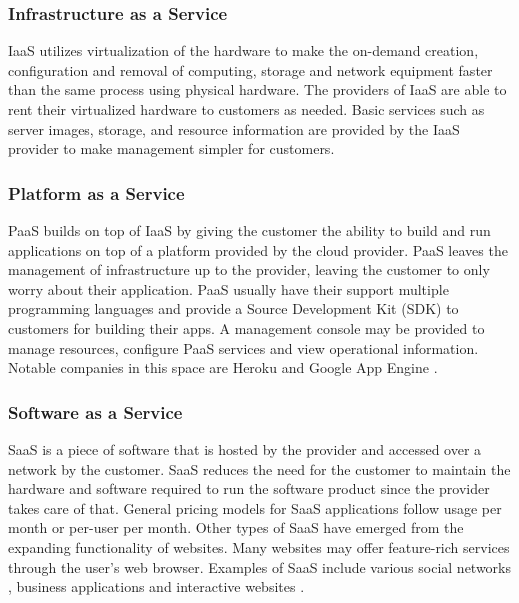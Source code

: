 \documentclass[12pt]{article}
\begin{document}
\subsubsection{Infrastructure as a Service} \label{ssub:iaas}

IaaS utilizes virtualization of the hardware to make the on-demand creation, configuration and removal of computing, storage and network equipment faster than the same process using physical hardware. The providers of IaaS are able to rent their virtualized hardware to customers as needed. Basic services such as server images, storage, and resource information are provided by the IaaS provider to make management simpler for customers.

\subsubsection{Platform as a Service} \label{ssub:paas}

PaaS builds on top of IaaS by giving the customer the ability to build and run applications on top of a platform provided by the cloud provider. PaaS leaves the management of infrastructure up to the provider, leaving the customer to only worry about their application. PaaS usually have their support multiple programming languages and provide a Source Development Kit (SDK) to customers for building their apps. A management console may be provided to manage resources, configure PaaS services and view operational information. Notable companies in this space are Heroku \cite{heroku} and Google App Engine \cite{googleappengine}.

\subsubsection{Software as a Service} \label{ssub:saas}

SaaS is a piece of software that is hosted by the provider and accessed over a network by the customer. SaaS reduces the need for the customer to maintain the hardware and software required to run the software product since the provider takes care of that. General pricing models for SaaS applications follow usage per month or per-user per month. Other types of SaaS have emerged from the expanding functionality of websites. Many websites may offer feature-rich services through the user's web browser. Examples of SaaS include various social networks \cite{facebook}, business applications \cite{salesforce} and interactive websites \cite{netflix}.
\end{document}
